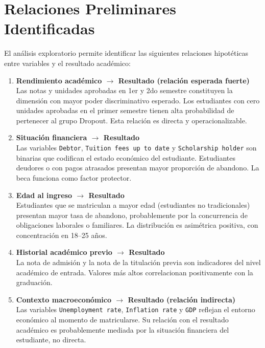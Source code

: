 \documentclass[11pt,a4paper]{article}
\begin{document}
\section{Relaciones Preliminares Identificadas}

El análisis exploratorio permite identificar las siguientes relaciones hipotéticas entre
variables y el resultado académico:

\begin{enumerate}[leftmargin=*, label=\textbf{R\arabic*.}]

  \item \textbf{Rendimiento académico $\rightarrow$ Resultado (relación esperada fuerte)}\\
  Las notas y unidades aprobadas en 1er y 2do semestre constituyen la dimensión con mayor
  poder discriminativo esperado. Los estudiantes con cero unidades aprobadas en el primer
  semestre tienen alta probabilidad de pertenecer al grupo Dropout. Esta relación es directa
  y operacionalizable.

  \item \textbf{Situación financiera $\rightarrow$ Resultado}\\
  Las variables \texttt{Debtor}, \texttt{Tuition fees up to date} y
  \texttt{Scholarship holder} son binarias que codifican el estado económico del estudiante.
  Estudiantes deudores o con pagos atrasados presentan mayor proporción de abandono. La
  beca funciona como factor protector.

  \item \textbf{Edad al ingreso $\rightarrow$ Resultado}\\
  Estudiantes que se matriculan a mayor edad (estudiantes no tradicionales) presentan mayor
  tasa de abandono, probablemente por la concurrencia de obligaciones laborales o familiares.
  La distribución es asimétrica positiva, con concentración en 18--25 años.

  \item \textbf{Historial académico previo $\rightarrow$ Resultado}\\
  La nota de admisión y la nota de la titulación previa son indicadores del nivel académico
  de entrada. Valores más altos correlacionan positivamente con la graduación.

  \item \textbf{Contexto macroeconómico $\rightarrow$ Resultado (relación indirecta)}\\
  Las variables \texttt{Unemployment rate}, \texttt{Inflation rate} y \texttt{GDP} reflejan
  el entorno económico al momento de matricularse. Su relación con el resultado académico es
  probablemente mediada por la situación financiera del estudiante, no directa.


\end{enumerate}
\end{document}
